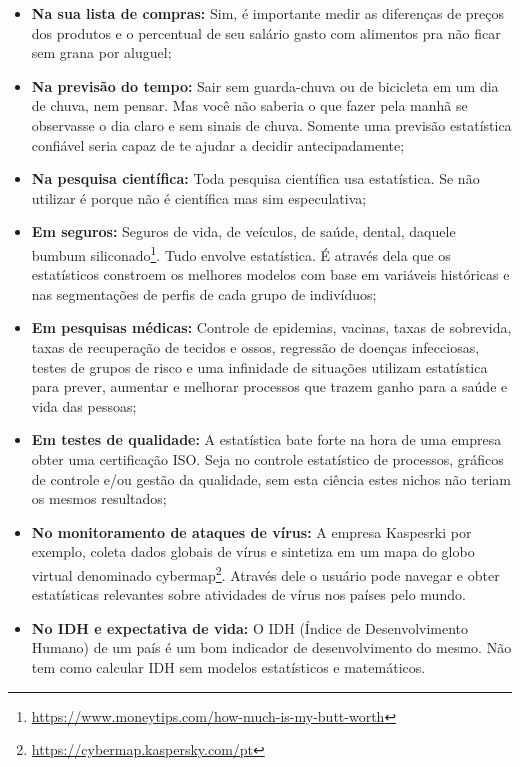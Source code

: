 \documentclass[11pt,]{style/krantz}
\renewcommand{\href}[2]{#2\footnote{\url{#1}}}
\theoremstyle{definition}
\theoremstyle{definition}
\theoremstyle{definition}
\theoremstyle{remark}
\begin{document}
\begin{itemize}
\item
  \textbf{Na sua lista de compras:} Sim, é importante medir as diferenças de preços dos produtos e o percentual de seu salário gasto com alimentos pra não ficar sem grana por aluguel;
\item
  \textbf{Na previsão do tempo:} Sair sem guarda-chuva ou de bicicleta em um dia de chuva, nem pensar. Mas você não saberia o que fazer pela manhã se observasse o dia claro e sem sinais de chuva. Somente uma previsão estatística confiável seria capaz de te ajudar a decidir antecipadamente;
\item
  \textbf{Na pesquisa científica:} Toda pesquisa científica usa estatística. Se não utilizar é porque não é científica mas sim especulativa;
\item
  \textbf{Em seguros:} Seguros de vida, de veículos, de saúde, dental, daquele \href{https://www.moneytips.com/how-much-is-my-butt-worth}{bumbum siliconado}. Tudo envolve estatística. É através dela que os estatísticos constroem os melhores modelos com base em variáveis históricas e nas segmentações de perfis de cada grupo de indivíduos;
\item
  \textbf{Em pesquisas médicas:} Controle de epidemias, vacinas, taxas de sobrevida, taxas de recuperação de tecidos e ossos, regressão de doenças infecciosas, testes de grupos de risco e uma infinidade de situações utilizam estatística para prever, aumentar e melhorar processos que trazem ganho para a saúde e vida das pessoas;
\item
  \textbf{Em testes de qualidade:} A estatística bate forte na hora de uma empresa obter uma certificação ISO. Seja no controle estatístico de processos, gráficos de controle e/ou gestão da qualidade, sem esta ciência estes nichos não teriam os mesmos resultados;
\item
  \textbf{No monitoramento de ataques de vírus:} A empresa Kaspesrki por exemplo, coleta dados globais de vírus e sintetiza em um mapa do globo virtual denominado \href{https://cybermap.kaspersky.com/pt}{cybermap}. Através dele o usuário pode navegar e obter estatísticas relevantes sobre atividades de vírus nos países pelo mundo.
\item
  \textbf{No IDH e expectativa de vida:} O IDH (Índice de Desenvolvimento Humano) de um país é um bom indicador de desenvolvimento do mesmo. Não tem como calcular IDH sem modelos estatísticos e matemáticos.
\end{itemize}
\end{document}
